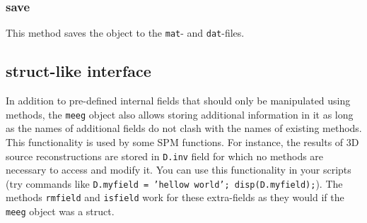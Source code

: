 \subsubsection{save}
This method saves the object to the \texttt{mat}- and \texttt{dat}-files.

\subsection{struct-like interface}
In addition to pre-defined internal fields that should only be manipulated using methods, the \texttt{meeg} object also allows storing additional information in it as long as the names of additional fields do not clash with the names of existing methods. This functionality is used by some SPM functions. For instance, the results of 3D source reconstructions are stored in \texttt{D.inv} field for which no methods are necessary to access and modify it. You can use this functionality in your scripts (try commands like \texttt{D.myfield = 'hellow world'; disp(D.myfield);}). The methods \texttt{rmfield} and \texttt{isfield} work for these extra-fields as they would if the \texttt{meeg} object was a struct.

